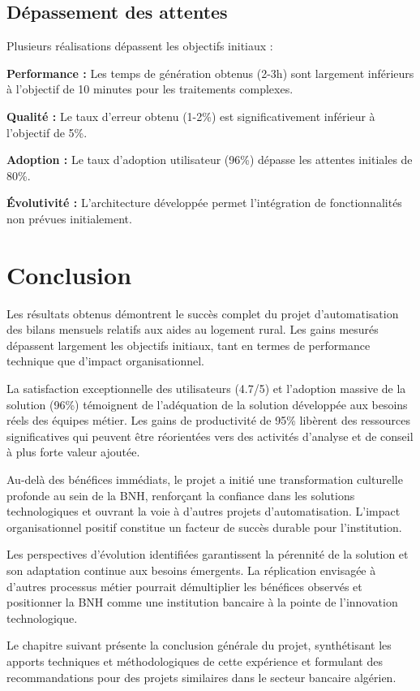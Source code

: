 \subsection{Dépassement des attentes}

Plusieurs réalisations dépassent les objectifs initiaux :

\medskip

\textbf{Performance :} Les temps de génération obtenus (2-3h) sont largement inférieurs à l'objectif de 10 minutes pour les traitements complexes.

\textbf{Qualité :} Le taux d'erreur obtenu (1-2\%) est significativement inférieur à l'objectif de 5\%.

\textbf{Adoption :} Le taux d'adoption utilisateur (96\%) dépasse les attentes initiales de 80\%.

\textbf{Évolutivité :} L'architecture développée permet l'intégration de fonctionnalités non prévues initialement.

\section{Conclusion}

Les résultats obtenus démontrent le succès complet du projet d'automatisation des bilans mensuels relatifs aux aides au logement rural. Les gains mesurés dépassent largement les objectifs initiaux, tant en termes de performance technique que d'impact organisationnel.

\medskip

La satisfaction exceptionnelle des utilisateurs (4.7/5) et l'adoption massive de la solution (96\%) témoignent de l'adéquation de la solution développée aux besoins réels des équipes métier. Les gains de productivité de 95\% libèrent des ressources significatives qui peuvent être réorientées vers des activités d'analyse et de conseil à plus forte valeur ajoutée.

\medskip

Au-delà des bénéfices immédiats, le projet a initié une transformation culturelle profonde au sein de la BNH, renforçant la confiance dans les solutions technologiques et ouvrant la voie à d'autres projets d'automatisation. L'impact organisationnel positif constitue un facteur de succès durable pour l'institution.

\medskip

Les perspectives d'évolution identifiées garantissent la pérennité de la solution et son adaptation continue aux besoins émergents. La réplication envisagée à d'autres processus métier pourrait démultiplier les bénéfices observés et positionner la BNH comme une institution bancaire à la pointe de l'innovation technologique.

\medskip

Le chapitre suivant présente la conclusion générale du projet, synthétisant les apports techniques et méthodologiques de cette expérience et formulant des recommandations pour des projets similaires dans le secteur bancaire algérien.